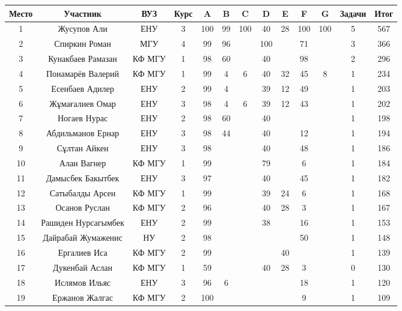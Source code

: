 \begin{center}
\begin{longtable}{|c|c|c|c|*{7}{c|}c|c|}
\hline
Место & Участник & ВУЗ & Курс & A & B & C & D & E & F & G & Задачи & Итог \\
\hline
\endhead
1 & Жусупов Али & ЕНУ&  3 &  100   &  99   &  100   & 40  & 28  &  100   &  100   & 5 & 567\\
\hline
2 & Спиркин Роман & МГУ&  4 &  99   &  96   &  &  100   &  & 71  &  & 3 & 366\\
\hline
3 & Кунакбаев Рамазан & КФ МГУ&  1 &  98   & 60  &  & 40  &  &  98   &  & 2 & 296\\
\hline
4 & Понамарёв Валерий & КФ МГУ&  1 &  99   & 4  & 6  & 40  & 32  & 45  & 8  & 1 & 234\\
\hline
5 & Есенбаев Адилер & ЕНУ&  2 &  99   & 4  &  & 39  & 12  & 49  &  & 1 & 203\\
\hline
6 & Жұмағалиев Омар & ЕНУ&  3 &  98   & 4  & 6  & 39  & 12  & 43  &  & 1 & 202\\
\hline
7 & Ногаев Нурас & ЕНУ&  2 &  98   & 60  &  & 40  &  &  &  & 1 & 198\\
\hline
8 & Абдильманов Ернар & ЕНУ&  3 &  98   & 44  &  & 40  &  & 12  &  & 1 & 194\\
\hline
9 & Сұлтан Айкен & ЕНУ&  3 &  98   &  &  & 40  &  & 48  &  & 1 & 186\\
\hline
10 & Алан Вагнер & КФ МГУ&  1  &  99   &  &  & 79  &  & 6  &  & 1 & 184\\
\hline
11 & Дамысбек Бакытбек & ЕНУ&  3 &  97   &  &  & 40  &  & 45  &  & 1 & 182\\
\hline
12 & Сатыбалды Арсен & КФ МГУ&  1 &  99   &  &  & 39  & 24  & 6  &  & 1 & 168\\
\hline
13 & Осанов Руслан & КФ МГУ&  2 &  96   &  &  & 40  & 28  & 3  &  & 1 & 167\\
\hline
14 & Рашиден Нурсагымбек & ЕНУ&  2 &  99   &  &  & 38  &  & 16  &  & 1 & 153\\
\hline
15 & Дайрабай Жумаженис & НУ &  2 &  98   &  &  &  &  & 50  &  & 1 & 148\\
\hline
16 & Ергалиев Иса & КФ МГУ&  2 &  99   &  &  &  & 40  &  &  & 1 & 139\\
\hline
17 & Дукенбай Аслан & КФ МГУ&  1 & 59  &  &  & 40  & 28  & 3  &  & 0 & 130\\
\hline
18 & Ислямов Ильяс & ЕНУ&  3 &  96   & 6  &  &  &  & 18  &  & 1 & 120\\
\hline
19 & Ержанов Жалгас & КФ МГУ&  2 &  100   &  &  &  &  & 9  &  & 1 & 109\\

\end{longtable}
\end{center}
